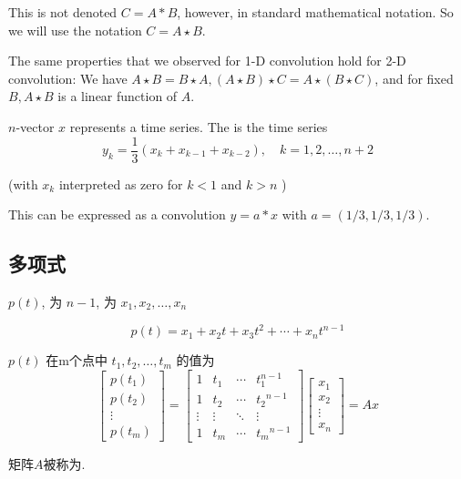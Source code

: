This is not denoted $ C=A * B $, however, in standard mathematical notation. So we will use the notation $ C=A \star B $.

The same properties that we observed for 1-D convolution hold for 2-D convolution: We have $ A \star B=B \star A,(A \star B) \star C=A \star(B \star C) $, and for fixed $ B, A \star B $ is a linear function of $ A $.

\begin{example}
    $ n $-vector $ x $ represents a time series. The  is the time series
$$
y_{k}=\frac{1}{3}\left(x_{k}+x_{k-1}+x_{k-2}\right), \quad k=1,2, \ldots, n+2
$$

(with $ x_{k} $ interpreted as zero for $ k<1 $ and $ k>n $ )

This can be expressed as a convolution $ y=a * x $ with $ a=(1 / 3,1 / 3,1 / 3) $.
\end{example}

\subsection{多项式}

\begin{definition}[多项式]
     $ p(t) $, 为 $ n-1 $, 为 $ x_{1}, x_{2}, \ldots, x_{n} $

    $$
p(t)=x_{1}+x_{2} t+x_{3} t^{2}+\cdots+x_{n} t^{n-1}
$$
\end{definition}

\begin{definition}
    $ {p}({t}) $ 在m个点中 $ t_{1}, t_{2}, \ldots, t_{m} $ 的值为
    $$
    \left[\begin{array}{c}
    p\left(t_{1}\right) \\
    p\left(t_{2}\right) \\
    \vdots \\
    p\left(t_{m}\right)
    \end{array}\right]=\left[\begin{array}{cccc}
    1 & t_{1} & \cdots & t_{1}^{n-1} \\
    1 & t_{2} & \cdots & t_{2}{ }^{n-1} \\
    \vdots & \vdots & \ddots & \vdots \\
    1 & t_{m} & \cdots & t_{m}{ }^{n-1}
    \end{array}\right]\left[\begin{array}{c}
    x_{1} \\
    x_{2} \\
    \vdots \\
    x_{n}
    \end{array}\right]=A x
    $$

    矩阵$A$被称为.
\end{definition}

